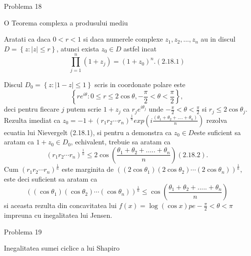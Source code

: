 \documentclass[a4paper,12pt,oneside]{report}
\begin{document}
Problema 18 

O Teorema complexa a produsului mediu 

Aratati ca daca \(0 < r < 1\) si daca numerele complexe \(z_{1}, z_{2},...,z_{n}\) au in discul \(D = \left \{ z: \left | z \right | \leq r\right \}\), atunci exista \(z_{0} \in D\) astfel incat 
\begin{displaymath}
    \prod_{j = 1}^{n}\left ( 1 + z_{j} \right ) = \left ( 1 + z_{0} \right )^{n}. (2.18.1)
\end{displaymath}

Discul \(D_{0} = \left \{ z : \left | 1 - z \right |\leq 1 \right \}\) scris in coordonate polare este 
\begin{displaymath}
    \left \{ re^{i\theta } : 0 \leq r\leq 2\cos\theta , -\frac{\pi }{2}< \theta  < \frac{\pi }{2} \right \},
\end{displaymath}
deci pentru fiecare \(j\) putem scrie \(1 + z_{j}\) ca \(r_{j}e^{i\theta _{j}}\) unde \(-\frac{\pi }{2}< \theta  < \frac{\pi }{2}\) si \( r_{j}\leq 2\cos\theta _{j}\). Rezulta imediat ca \(z_{0} = -1 + \left ( r_{1} r_{2}\cdots r_{n}\right )^{\frac{1}{n}}exp\left ( i\frac{\left ( \theta _{1} + \theta _{2} +....+ \theta _{n} \right )}{n} \right )\) rezolva ecuatia lui Nievergelt (2.18.1), si pentru a demonstra ca \(z_{0}\in D \)este suficient sa aratam ca \(1 + z_{0}\in D_{0}\), echivalent, trebuie sa aratam ca 
\begin{displaymath}
    \left ( r_{1} r_{2} \cdots r_{n}\right )^{\frac{1}{n}}\leq 2\cos\left ( \frac{\theta _{1} + \theta _{2}+.....+\theta _{n}}{n} \right ) (2.18.2). 
\end{displaymath}
Cum \(\left ( r_{1} r_{2} \cdots r_{n}\right )^{\frac{1}{n}}\) este marginita de \(\left ( \left (2\cos\theta _{1}  \right )\left ( 2\cos\theta _{2} \right )\cdots \left (2\cos\theta _{n}  \right ) \right )^{\frac{1}{n}}\), este deci suficient sa aratam ca 
\begin{displaymath}
    \left ( \left (\cos\theta _{1}  \right )\left ( \cos\theta _{2} \right )\cdots \left (\cos\theta _{n}  \right ) \right )^{\frac{1}{n}}\leq \cos\left ( \frac{\theta _{1} + \theta _{2}+.....+\theta _{n}}{n} \right )
\end{displaymath}
si aceasta rezulta din concavitatea lui \(f\left ( x \right ) = \log \left ( \cos x \right ) pe -\frac{\pi }{2}< \theta < \pi\) impreuna cu inegalitatea lui Jensen. 


Problema 19 

Inegalitatea sumei ciclice a lui Shapiro
\end{document}
